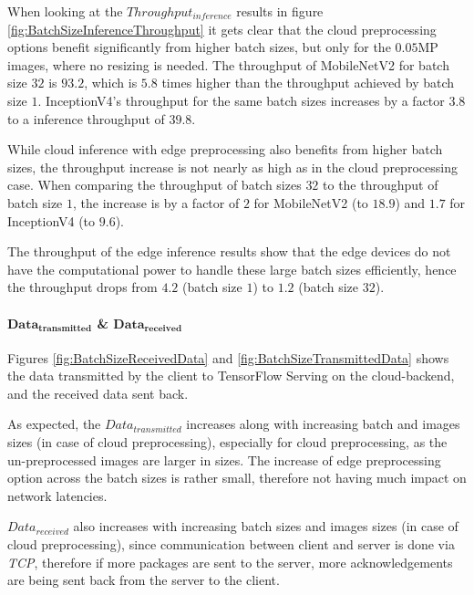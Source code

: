 When looking at the $Throughput_{inference}$ results in figure \ref{fig:BatchSizeInferenceThroughput} it gets clear that the cloud preprocessing options benefit significantly from higher batch sizes, but only for the $0.05$MP images, where no resizing is needed.
The throughput of MobileNetV2 for batch size $32$ is $93.2$, which is $5.8$ times higher than the throughput achieved by batch size $1$. 
InceptionV4's throughput for the same batch sizes increases by a factor $3.8$ to a inference throughput of $39.8$.

While cloud inference with edge preprocessing also benefits from higher batch sizes, the throughput increase is not nearly as high as in the cloud preprocessing case.
When comparing the throughput of batch sizes $32$ to the throughput of batch size $1$, the increase is by a factor of $2$ for MobileNetV2 (to $18.9$) and $1.7$ for InceptionV4 (to $9.6$).

The throughput of the edge inference results show that the edge devices do not have the computational power to handle these large batch sizes efficiently, hence the throughput drops from $4.2$ (batch size $1$) to $1.2$ (batch size $32$).


\paragraph{$\mathbf{Data_{transmitted}}$ \& $\mathbf{Data_{received}}$}
Figures \ref{fig:BatchSizeReceivedData} and \ref{fig:BatchSizeTransmittedData} shows the data transmitted by the client to TensorFlow Serving on the cloud-backend, and the received data sent back.

As expected, the $Data_{transmitted}$ increases along with increasing batch and images sizes (in case of cloud preprocessing), especially for cloud preprocessing, as the un-preprocessed images are larger in sizes.
The increase of edge preprocessing option across the batch sizes is rather small, therefore not having much impact on network latencies.

$Data_{received}$ also increases with increasing batch sizes and images sizes (in case of cloud preprocessing), since communication between client and server is done via \emph{TCP}, therefore if more packages are sent to the server, more acknowledgements are being sent back from the server to the client.


